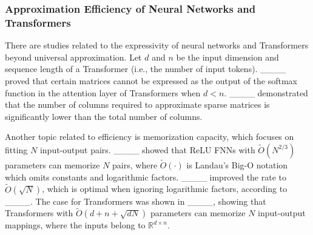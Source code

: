 \subsubsection{Approximation Efficiency of Neural Networks and Transformers}

There are studies related to the expressivity of neural networks and Transformers beyond universal approximation.
Let $d$ and $n$ be the input dimension and sequence length of a Transformer (i.e., the number of input tokens).
____ proved that certain matrices cannot be expressed as the output of the softmax function in the attention layer of Transformers when $d < n$.
____ demonstrated that the number of columns required to approximate sparse matrices is significantly lower than the total number of columns.

Another topic related to efficiency is memorization capacity, which focuses on fitting $N$ input-output pairs.
____ showed that ReLU FNNs with $\tilde{O}(N^{2/3})$ parameters can memorize $N$ pairs, where $\tilde{O}(\cdot)$ is Landau's Big-O notation which omits constants and logarithmic factors.
____ improved the rate to $\tilde{O} (\sqrt{N})$, which is optimal when ignoring logarithmic factors, according to ____.
The case for Transformers was shown in ____, showing that Transformers with $\tilde{O} (d + n + \sqrt{dN})$ parameters can memorize $N$ input-output mappings, where the inputs belong to $\mathbb{R}^{d\times n}$.